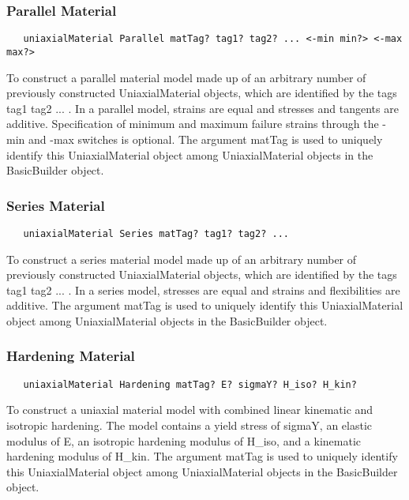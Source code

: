 \documentclass[12pt]{article}
\begin{document}
\subsubsection{Parallel Material}
{\sf\small
\begin{verbatim}
   uniaxialMaterial Parallel matTag? tag1? tag2? ... <-min min?> <-max max?>
\end{verbatim}
}

\noindent To construct a parallel material model made up of an
arbitrary number of previously constructed UniaxialMaterial objects, 
which are identified by the tags tag1 tag2 ... . In a parallel model,
strains are equal and stresses and tangents are additive. Specification of
minimum and maximum failure strains through the -min and -max switches
is optional. The argument matTag is used to
uniquely identify this UniaxialMaterial object among UniaxialMaterial objects
in the BasicBuilder object.

\subsubsection{Series Material}
{\sf\small
\begin{verbatim}
   uniaxialMaterial Series matTag? tag1? tag2? ... 
\end{verbatim}
}

\noindent To construct a series material model made up of an
arbitrary number of previously constructed UniaxialMaterial objects, 
which are identified by the tags tag1 tag2 ... . In a series model,
stresses are equal and strains and flexibilities are additive. The argument matTag 
is used to uniquely identify this UniaxialMaterial object among UniaxialMaterial objects
in the BasicBuilder object.

\subsubsection{Hardening Material}
{\sf\small
\begin{verbatim}
   uniaxialMaterial Hardening matTag? E? sigmaY? H_iso? H_kin?
\end{verbatim}
}

\noindent To construct a uniaxial material model with combined linear kinematic
and isotropic hardening. The model contains a yield stress of sigmaY, an
elastic modulus of E, an isotropic hardening modulus of H\_iso, and a
kinematic hardening modulus of H\_kin. The argument matTag is used to 
uniquely identify this UniaxialMaterial object among UniaxialMaterial objects
in the BasicBuilder object.
\end{document}
